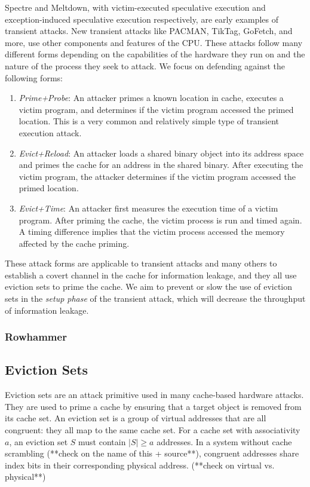 Spectre and Meltdown, with victim-executed speculative execution and exception-induced speculative execution respectively, 
are early examples of transient attacks.
New transient attacks like PACMAN, TikTag, GoFetch, and more, use other components and features of the CPU.
These attacks follow many different forms depending on the capabilities of the hardware they run on and the
nature of the process they seek to attack.
We focus on defending against the following forms:
\begin{enumerate}
    \item \textit{Prime+Probe}:
An attacker primes a known location in cache, executes a victim program, and determines 
if the victim program accessed the primed location. This is a very common and relatively simple
type of transient execution attack.
    \item \textit{Evict+Reload}:
An attacker loads a shared binary object into its address space and primes the cache for an address
in the shared binary.
After executing the victim program, the attacker determines if the victim program accessed the primed location.
    \item \textit{Evict+Time}:
An attacker first measures the execution time of a victim program.
After priming the cache, the victim process is run and timed again.
A timing difference implies that the victim process accessed the memory affected by the cache priming.
\end{enumerate}

These attack forms are applicable to transient attacks and many others to establish a covert channel in the cache for information leakage,
and they all use eviction sets to prime the cache.
We aim to prevent or slow the use of eviction sets in the \textit{setup phase} of the transient attack, which will decrease the throughput of information leakage.

\subsubsection{Rowhammer}

\subsection{Eviction Sets}
Eviction sets are an attack primitive used in many cache-based hardware attacks.
They are used to prime a cache by ensuring that a target object is removed from its cache set.
An eviction set is a group of virtual addresses that are all congruent: they all map to the same cache set.
For a cache set with associativity $a$, an eviction set $S$ must contain $|S| \geq a$ addresses.
In a system without cache scrambling (**check on the name of this + source**), congruent addresses share index bits in their
corresponding physical address. (**check on virtual vs. physical**)

